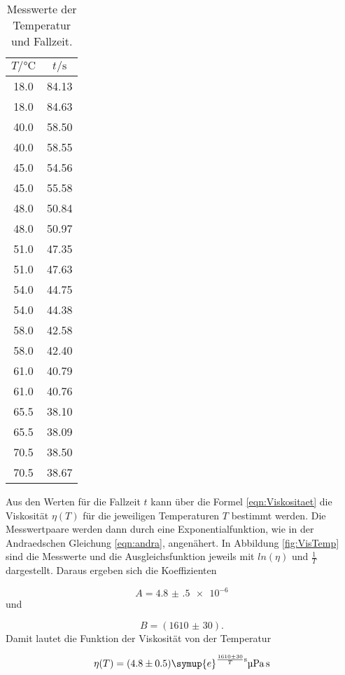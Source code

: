 \begin{table}[h]
  \centering
  \caption{Messwerte der Temperatur und Fallzeit.}
  \label{tab:FallTemp}
  \begin{tabular}{c c}
    \toprule
    $T/\si{\celsius}$ & $t/\si{\second}$ \\
    \midrule
    18.0 & 84.13 \\
    18.0 & 84.63 \\
    40.0 & 58.50 \\
    40.0 & 58.55 \\
    45.0 & 54.56 \\
    45.0 & 55.58 \\
    48.0 & 50.84 \\
    48.0 & 50.97 \\
    51.0 & 47.35 \\
    51.0 & 47.63 \\
    54.0 & 44.75 \\
    54.0 & 44.38 \\
    58.0 & 42.58 \\
    58.0 & 42.40 \\
    61.0 & 40.79 \\
    61.0 & 40.76 \\
    65.5 & 38.10 \\
    65.5 & 38.09 \\
    70.5 & 38.50 \\
    70.5 & 38.67 \\
    \bottomrule
  \end{tabular}
\end{table}

Aus den Werten für die Fallzeit $t$ kann über die Formel \eqref{eqn:Viskositaet}
die Viskosität $\eta(T)$ für die jeweiligen Temperaturen $T$ bestimmt werden.
Die Messwertpaare werden dann durch eine Exponentialfunktion, wie in der
Andraedschen Gleichung \eqref{eqn:andra}, angenähert.
In Abbildung \ref{fig:VisTemp} sind die Messwerte und die Ausgleichsfunktion
jeweils mit $ln(\eta)$ und $\frac{1}{T}$ dargestellt.
Daraus ergeben sich die Koeffizienten

\begin{equation}
  A = \num{4.8(5)e-6}
\end{equation}
und

\begin{equation}
  B = (\num{1610(30)}).
\end{equation}
Damit lautet die Funktion der Viskosität von der Temperatur

\begin{equation}
  \eta(T) = (\num{4.8(5)}) \symup{e}^{\frac{\num{1610(30)}}{T}\si{\second}}
  \si{\micro\pascal\second}
\end{equation}

